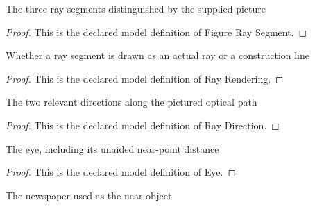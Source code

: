 \begin{definition}
  \label{def:physics:phyx-mini-0129:phyxminiproblems-problemphyxmini0129-figureraysegment}
  The three ray segments distinguished by the supplied picture
\end{definition}
\begin{proof}
  This is the declared model definition of Figure Ray Segment.
\end{proof}
\begin{definition}
  \label{def:physics:phyx-mini-0129:phyxminiproblems-problemphyxmini0129-rayrendering}
  Whether a ray segment is drawn as an actual ray or a construction line
\end{definition}
\begin{proof}
  This is the declared model definition of Ray Rendering.
\end{proof}
\begin{definition}
  \label{def:physics:phyx-mini-0129:phyxminiproblems-problemphyxmini0129-raydirection}
  The two relevant directions along the pictured optical path
\end{definition}
\begin{proof}
  This is the declared model definition of Ray Direction.
\end{proof}
\begin{definition}[Eye]
  \label{def:physics:phyx-mini-0129:phyxminiproblems-problemphyxmini0129-eye}
  The eye, including its unaided near-point distance
\end{definition}
\begin{proof}
  This is the declared model definition of Eye.
\end{proof}
\begin{definition}[Newspaper]
  \label{def:physics:phyx-mini-0129:phyxminiproblems-problemphyxmini0129-newspaper}
  The newspaper used as the near object
\end{definition}
